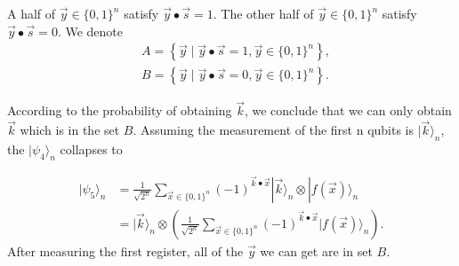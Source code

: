 A half of $\vec{y} \in \{0,1\}^n$ satisfy $\vec{y} \bullet \vec{s}=1$. The other half of $\vec{y} \in \{0,1\}^n$ satisfy $\vec{y} \bullet \vec{s}=0$. We denote 
$$
\begin{aligned}
        & A=\left\{\vec{y} \mid \vec{y} \bullet \vec{s} = 1, \vec{y} \in\{0,1\}^n\right\}, \\
        & B=\left\{\vec{y} \mid \vec{y} \bullet \vec{s} = 0, \vec{y} \in\{0,1\}^n\right\}.
    \end{aligned}
$$

According to the probability of obtaining $\vec{k}$, we conclude that we can only obtain $\vec{k}$ which is in the set $B$. Assuming the measurement of the first n qubits is $|\vec{k}\rangle_n$, the $|\psi_4\rangle_n$ collapses to

$$
\begin{aligned}
|\psi_5\rangle_n 
& = \frac{1}{\sqrt{2^n}} \sum_{\vec{x} \in\{0,1\}^n}(-1)^{\vec{k} \bullet \vec{x}}|\vec{k}\rangle_n \otimes|f(\vec{x})\rangle_n\\
& = |\vec{k}\rangle_n \otimes\left(\frac{1}{\sqrt{2^n}} \sum_{\vec{x} \in\{0,1\}^n}(-1)^{\vec{k} \bullet \vec{x}}|f(\vec{x})\rangle_n\right).
\end{aligned}
$$
After measuring the first register, all of the $\vec{y}$ we can get are in set $B$. 


